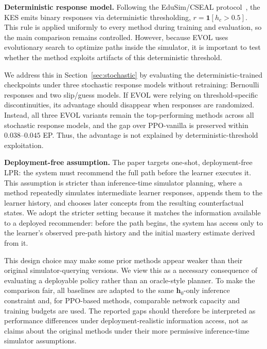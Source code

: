 \documentclass[sigconf,anonymous]{acmart}
\newcommand{\ours}{\textrm{EVOL}}
\begin{document}
\textbf{Deterministic response model.}
Following the EduSim/CSEAL protocol~\cite{liu2019cseal}, the KES emits binary responses via deterministic thresholding, $r=\mathbf{1}[h_c>0.5]$. This rule is applied uniformly to every method during training and evaluation, so the main comparison remains controlled. However, because \ours{} uses evolutionary search to optimize paths inside the simulator, it is important to test whether the method exploits artifacts of this deterministic threshold.

We address this in Section~\ref{sec:stochastic} by evaluating the deterministic-trained checkpoints under three stochastic response models without retraining: Bernoulli responses and two slip/guess models. If \ours{} were relying on threshold-specific discontinuities, its advantage should disappear when responses are randomized. Instead, all three \ours{} variants remain the top-performing methods across all stochastic response models, and the gap over PPO-vanilla is preserved within $0.038$--$0.045$ EP. Thus, the advantage is not explained by deterministic-threshold exploitation.

\textbf{Deployment-free assumption.}
The paper targets one-shot, deployment-free LPR: the system must recommend the full path before the learner executes it. This assumption is stricter than inference-time simulator planning, where a method repeatedly simulates intermediate learner responses, appends them to the learner history, and chooses later concepts from the resulting counterfactual states. We adopt the stricter setting because it matches the information available to a deployed recommender: before the path begins, the system has access only to the learner's observed pre-path history and the initial mastery estimate derived from it.

This design choice may make some prior methods appear weaker than their original simulator-querying versions. We view this as a necessary consequence of evaluating a deployable policy rather than an oracle-style planner. To make the comparison fair, all baselines are adapted to the same $\mathbf{h}_0$-only inference constraint and, for PPO-based methods, comparable network capacity and training budgets are used. The reported gaps should therefore be interpreted as performance differences under deployment-realistic information access, not as claims about the original methods under their more permissive inference-time simulator assumptions.
\end{document}
